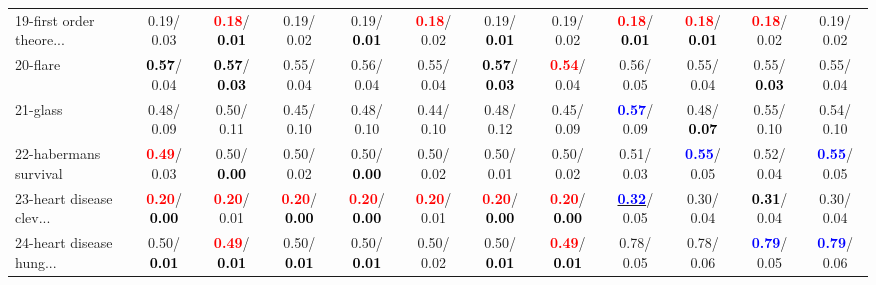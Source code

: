 \begin{table}[h]
\begin{center}
{\begin{tabular}{lc|c|c|c|c|c|c|c|c|c|c}
19-first order theore... &   0.19/  0.03 & \textcolor{red}{\textbf{  0.18}}/\textcolor{black}{\textbf{  0.01}} &   0.19/  0.02 &   0.19/\textcolor{black}{\textbf{  0.01}} & \textcolor{red}{\textbf{  0.18}}/  0.02 &   0.19/\textcolor{black}{\textbf{  0.01}} &   0.19/  0.02 & \textcolor{red}{\textbf{  0.18}}/\textcolor{black}{\textbf{  0.01}} & \textcolor{red}{\textbf{  0.18}}/\textcolor{black}{\textbf{  0.01}} & \textcolor{red}{\textbf{  0.18}}/  0.02 &   0.19/  0.02 \\
20-flare & \textcolor{black}{\textbf{  0.57}}/  0.04 & \textcolor{black}{\textbf{  0.57}}/\textcolor{black}{\textbf{  0.03}} &   0.55/  0.04 &   0.56/  0.04 &   0.55/  0.04 & \textcolor{black}{\textbf{  0.57}}/\textcolor{black}{\textbf{  0.03}} & \textcolor{red}{\textbf{  0.54}}/  0.04 &   0.56/  0.05 &   0.55/  0.04 &   0.55/\textcolor{black}{\textbf{  0.03}} &   0.55/  0.04 \\
21-glass &   0.48/  0.09 &   0.50/  0.11 &   0.45/  0.10 &   0.48/  0.10 &   0.44/  0.10 &   0.48/  0.12 &   0.45/  0.09 & \textcolor{blue}{\textbf{  0.57}}/  0.09 &   0.48/\textcolor{black}{\textbf{  0.07}} &   0.55/  0.10 &   0.54/  0.10 \\ \hline
22-habermans survival & \textcolor{red}{\textbf{  0.49}}/  0.03 &   0.50/\textcolor{black}{\textbf{  0.00}} &   0.50/  0.02 &   0.50/\textcolor{black}{\textbf{  0.00}} &   0.50/  0.02 &   0.50/  0.01 &   0.50/  0.02 &   0.51/  0.03 & \textcolor{blue}{\textbf{  0.55}}/  0.05 &   0.52/  0.04 & \textcolor{blue}{\textbf{  0.55}}/  0.05 \\
23-heart disease clev... & \textcolor{red}{\textbf{  0.20}}/\textcolor{black}{\textbf{  0.00}} & \textcolor{red}{\textbf{  0.20}}/  0.01 & \textcolor{red}{\textbf{  0.20}}/\textcolor{black}{\textbf{  0.00}} & \textcolor{red}{\textbf{  0.20}}/\textcolor{black}{\textbf{  0.00}} & \textcolor{red}{\textbf{  0.20}}/  0.01 & \textcolor{red}{\textbf{  0.20}}/\textcolor{black}{\textbf{  0.00}} & \textcolor{red}{\textbf{  0.20}}/\textcolor{black}{\textbf{  0.00}} & \underline{\textcolor{blue}{\textbf{  0.32}}}/  0.05 &   0.30/  0.04 & \textcolor{black}{\textbf{  0.31}}/  0.04 &   0.30/  0.04 \\
24-heart disease hung... &   0.50/\textcolor{black}{\textbf{  0.01}} & \textcolor{red}{\textbf{  0.49}}/\textcolor{black}{\textbf{  0.01}} &   0.50/\textcolor{black}{\textbf{  0.01}} &   0.50/\textcolor{black}{\textbf{  0.01}} &   0.50/  0.02 &   0.50/\textcolor{black}{\textbf{  0.01}} & \textcolor{red}{\textbf{  0.49}}/\textcolor{black}{\textbf{  0.01}} &   0.78/  0.05 &   0.78/  0.06 & \textcolor{blue}{\textbf{  0.79}}/  0.05 & \textcolor{blue}{\textbf{  0.79}}/  0.06 \\

\end{tabular}}
\end{center}
\end{table}
